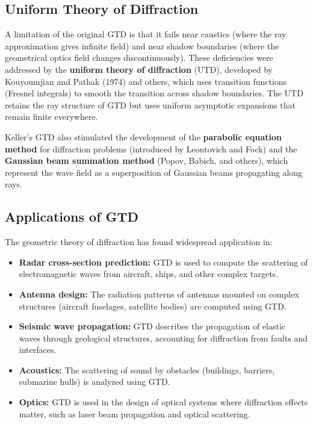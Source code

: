 \subsection{Uniform Theory of Diffraction}

A limitation of the original GTD is that it fails near caustics (where the ray approximation gives infinite field) and near shadow boundaries (where the geometrical optics field changes discontinuously). These deficiencies were addressed by the \textbf{uniform theory of diffraction} (UTD), developed by Kouyoumjian and Pathak (1974) and others, which uses transition functions (Fresnel integrals) to smooth the transition across shadow boundaries. The UTD retains the ray structure of GTD but uses uniform asymptotic expansions that remain finite everywhere.

Keller's GTD also stimulated the development of the \textbf{parabolic equation method} for diffraction problems (introduced by Leontovich and Fock) and the \textbf{Gaussian beam summation method} (Popov, Babich, and others), which represent the wave field as a superposition of Gaussian beams propagating along rays.

\subsection{Applications of GTD}

The geometric theory of diffraction has found widespread application in:

\begin{itemize}
  \item \textbf{Radar cross-section prediction:} GTD is used to compute the scattering of electromagnetic waves from aircraft, ships, and other complex targets.
  \item \textbf{Antenna design:} The radiation patterns of antennas mounted on complex structures (aircraft fuselages, satellite bodies) are computed using GTD.
  \item \textbf{Seismic wave propagation:} GTD describes the propagation of elastic waves through geological structures, accounting for diffraction from faults and interfaces.
  \item \textbf{Acoustics:} The scattering of sound by obstacles (buildings, barriers, submarine hulls) is analyzed using GTD.
  \item \textbf{Optics:} GTD is used in the design of optical systems where diffraction effects matter, such as laser beam propagation and optical scattering.
\end{itemize}

